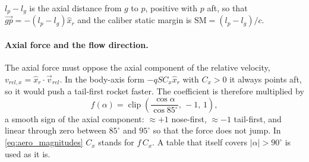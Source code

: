 $l_p-l_g$ is the axial distance from $g$ to $p$, positive with $p$ aft, so that
$\vec{gp}=-(l_p-l_g)\hat{x}_r$ and the caliber static margin is $\mathrm{SM}=(l_p-l_g)/c$.

\paragraph{Axial force and the flow direction.} The axial force must oppose the axial component of the relative velocity, $v_{rel,x}=\hat{x}_r\cdot
\vec{v}_{rel}$. In the body-axis form $-qSC_x\hat{x}_r$ with $C_x>0$ it always points aft, so it
would push a tail-first rocket faster. The coefficient is therefore multiplied by
\begin{equation} \label{eq:axial_factor}
    f(\alpha)=\operatorname{clip}\!\left(\frac{\cos\alpha}{\cos 85^\circ},\,-1,\,1\right),
\end{equation}
a smooth sign of the axial component: $\approx+1$ nose-first, $\approx-1$ tail-first, and linear
through zero between $85^\circ$ and $95^\circ$ so that the force does not jump. In
\autoref{eq:aero_magnitudes} $C_x$ stands for $f\,C_x$. A table that itself covers
$|\alpha|>90^\circ$ is used as it is.


